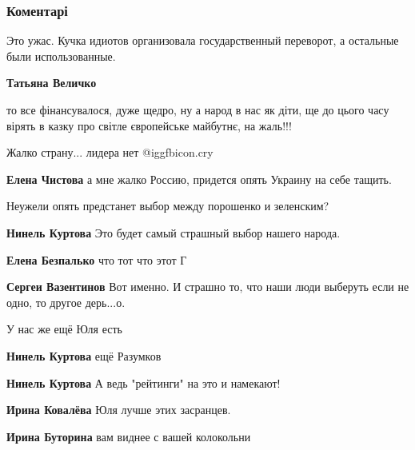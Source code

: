  
 
 
 
 
\subsubsection{Коментарі}
\label{sec:29_11_2021.fb.zhuravko_aleksej.2.maidan.cmt}

\begin{itemize} %
Это ужас. Кучка идиотов организовала государственный переворот, а остальные были использованные.

\textbf{Татьяна Величко} 

то все фінансувалося, дуже щедро, ну а народ в нас як діти, ще до цього часу
вірять в казку про світле європейське майбутнє, на жаль!!!

Жалко страну... лидера нет @igg{fbicon.cry} 

\textbf{Елена Чистова} а мне жалко Россию, придется опять Украину на себе тащить.

Неужели опять предстанет выбор между порошенко и зеленским?

\begin{itemize} %
\textbf{Нинель Куртова} Это будет самый страшный выбор нашего народа.

\textbf{Елена Безпалько} что тот что этот Г

\textbf{Сергеи Вазентинов} Вот именно. И страшно то, что наши люди выберуть если не одно, то другое дерь...о.

У нас же ещё Юля есть

\textbf{Нинель Куртова} ещё Разумков

\textbf{Нинель Куртова} А ведь "рейтинги" на это и намекают!

\textbf{Ирина Ковалёва} Юля лучше этих засранцев.

\textbf{Ирина Буторина} вам виднее с вашей колокольни

\end{itemize} %


\end{itemize}
